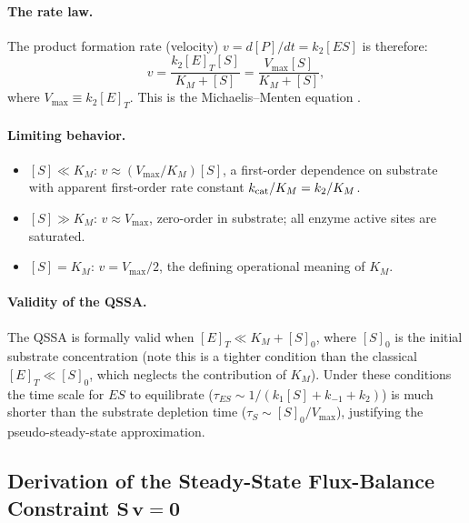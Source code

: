 \paragraph{The rate law.}
The product formation rate (velocity) $v = d[P]/dt = k_2[ES]$ is therefore:
\begin{equation}\label{eq:app_MM}
  v = \frac{k_2[E]_T[S]}{K_M + [S]} = \frac{V_{\max}[S]}{K_M + [S]},
\end{equation}
where $V_{\max} \equiv k_2[E]_T$.  This is the Michaelis--Menten equation
\cite{MichaelisMenten1913}.

\paragraph{Limiting behavior.}
\begin{itemize}
  \item $[S] \ll K_M$: $v \approx (V_{\max}/K_M)[S]$, a first-order dependence
    on substrate with apparent first-order rate constant $k_{\rm cat}/K_M =
    k_2/K_M$.
  \item $[S] \gg K_M$: $v \approx V_{\max}$, zero-order in substrate; all
    enzyme active sites are saturated.
  \item $[S] = K_M$: $v = V_{\max}/2$, the defining operational meaning of
    $K_M$.
\end{itemize}

\paragraph{Validity of the QSSA.}
The QSSA is formally valid when $[E]_T \ll K_M + [S]_0$, where $[S]_0$ is
the initial substrate concentration (note this is a tighter condition than the
classical $[E]_T \ll [S]_0$, which neglects the contribution of $K_M$).
Under these conditions the time scale for
$ES$ to equilibrate ($\tau_{ES} \sim 1/(k_1[S]+k_{-1}+k_2)$) is much shorter
than the substrate depletion time ($\tau_S \sim [S]_0/V_{\max}$), justifying
the pseudo-steady-state approximation.

\subsection{Derivation of the Steady-State Flux-Balance Constraint
            \texorpdfstring{$\mathbf{S}\,\mathbf{v}=\mathbf{0}$}{S v = 0}}
\label{sec:fba_derivation}

